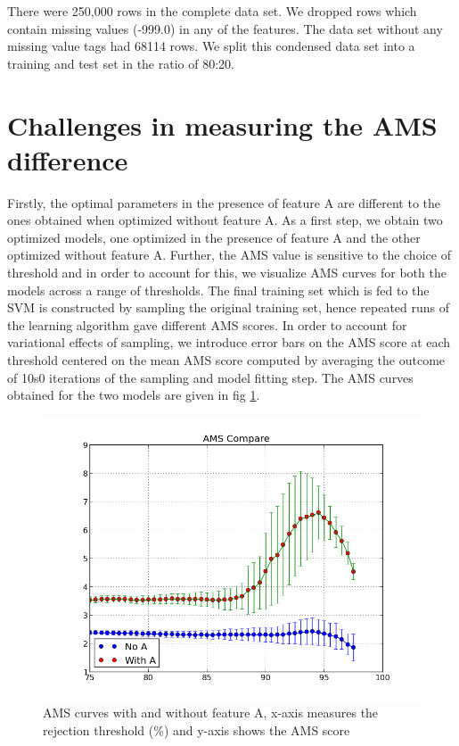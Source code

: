 \documentclass[final,3p,times,onecolumn]{elsarticle}
\begin{document}
There were 250,000 rows in the complete data set. We dropped rows which contain missing values (-999.0) in any of the features. The data set without any missing value tags had 68114 rows. We split this condensed data set into a training and test set in the ratio of 80:20.   

\section{Challenges in measuring the AMS difference}

Firstly, the optimal parameters in the presence of feature A are different to the ones obtained when optimized without feature A. As a first step, we obtain two optimized models, one optimized in the presence of feature A and the other optimized without feature A. Further, the AMS value is sensitive to the choice of threshold and in order to account for this, we visualize AMS curves for both the models across a range of thresholds. The final training set which is fed to the SVM is constructed by sampling the original training set, hence repeated runs of the learning algorithm gave different AMS scores. In order to account for variational effects of sampling, we introduce error bars on the AMS score at each threshold centered on the mean AMS score computed by averaging the outcome of 10s0 iterations of the sampling and model fitting step. The AMS curves obtained for the two models are given in fig \ref{ams_compare}.

\begin{figure}
\includegraphics[scale=0.8]{Images/AMS_compare.png}
\caption{AMS curves with and without feature A, x-axis measures the rejection threshold (\%) and y-axis shows the AMS score}
\label{ams_compare}
\end{figure}
  
\end{document}

